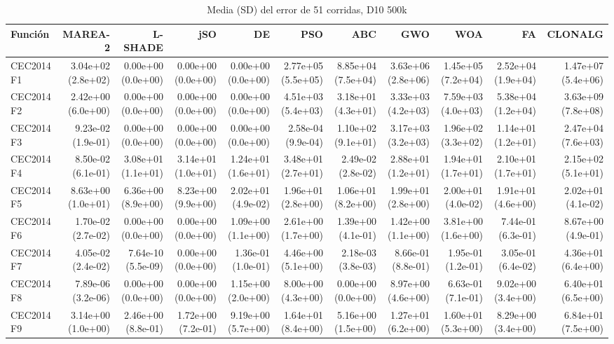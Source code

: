\begin{longtable}{lrrrrrrrrrr}
\caption{Media (SD) del error de 51 corridas, D10 500k}\\
\toprule
Función & MAREA-2 & L-SHADE & jSO & DE & PSO & ABC & GWO & WOA & FA & CLONALG \\
\midrule
\endhead
CEC2014 F1 & 3.04e+02 (2.8e+02) & 0.00e+00 (0.0e+00) & 0.00e+00 (0.0e+00) & 0.00e+00 (0.0e+00) & 2.77e+05 (5.5e+05) & 8.85e+04 (7.5e+04) & 3.63e+06 (2.8e+06) & 1.45e+05 (7.2e+04) & 2.52e+04 (1.9e+04) & 1.47e+07 (5.4e+06) \\
CEC2014 F2 & 2.42e+00 (6.0e+00) & 0.00e+00 (0.0e+00) & 0.00e+00 (0.0e+00) & 0.00e+00 (0.0e+00) & 4.51e+03 (5.4e+03) & 3.18e+01 (4.3e+01) & 3.33e+03 (4.2e+03) & 7.59e+03 (4.0e+03) & 5.38e+04 (1.2e+04) & 3.63e+09 (7.8e+08) \\
CEC2014 F3 & 9.23e-02 (1.9e-01) & 0.00e+00 (0.0e+00) & 0.00e+00 (0.0e+00) & 0.00e+00 (0.0e+00) & 2.58e-04 (9.9e-04) & 1.10e+02 (9.1e+01) & 3.17e+03 (3.2e+03) & 1.96e+02 (3.3e+02) & 1.14e+01 (1.2e+01) & 2.47e+04 (7.6e+03) \\
CEC2014 F4 & 8.50e-02 (6.1e-01) & 3.08e+01 (1.1e+01) & 3.14e+01 (1.0e+01) & 1.24e+01 (1.6e+01) & 3.48e+01 (2.7e+01) & 2.49e-02 (2.8e-02) & 2.88e+01 (1.2e+01) & 1.94e+01 (1.7e+01) & 2.10e+01 (1.7e+01) & 2.15e+02 (5.1e+01) \\
CEC2014 F5 & 8.63e+00 (1.0e+01) & 6.36e+00 (8.9e+00) & 8.23e+00 (9.9e+00) & 2.02e+01 (4.9e-02) & 1.96e+01 (2.8e+00) & 1.06e+01 (8.2e+00) & 1.99e+01 (2.8e+00) & 2.00e+01 (4.0e-02) & 1.91e+01 (4.6e+00) & 2.02e+01 (4.1e-02) \\
CEC2014 F6 & 1.70e-02 (2.7e-02) & 0.00e+00 (0.0e+00) & 0.00e+00 (0.0e+00) & 1.09e+00 (1.1e+00) & 2.61e+00 (1.7e+00) & 1.39e+00 (4.1e-01) & 1.42e+00 (1.1e+00) & 3.81e+00 (1.6e+00) & 7.44e-01 (6.3e-01) & 8.67e+00 (4.9e-01) \\
CEC2014 F7 & 4.05e-02 (2.4e-02) & 7.64e-10 (5.5e-09) & 0.00e+00 (0.0e+00) & 1.36e-01 (1.0e-01) & 4.46e+00 (5.1e+00) & 2.18e-03 (3.8e-03) & 8.66e-01 (8.8e-01) & 1.95e-01 (1.2e-01) & 3.05e-01 (6.4e-02) & 4.36e+01 (6.4e+00) \\
CEC2014 F8 & 7.89e-06 (3.2e-06) & 0.00e+00 (0.0e+00) & 0.00e+00 (0.0e+00) & 1.15e+00 (2.0e+00) & 8.00e+00 (4.3e+00) & 0.00e+00 (0.0e+00) & 8.97e+00 (4.6e+00) & 6.63e-01 (7.1e-01) & 9.02e+00 (3.4e+00) & 6.40e+01 (6.5e+00) \\
CEC2014 F9 & 3.14e+00 (1.0e+00) & 2.46e+00 (8.8e-01) & 1.72e+00 (7.2e-01) & 9.19e+00 (5.7e+00) & 1.64e+01 (8.4e+00) & 5.16e+00 (1.5e+00) & 1.27e+01 (6.2e+00) & 1.60e+01 (5.3e+00) & 8.29e+00 (3.4e+00) & 6.84e+01 (7.5e+00) \\

\end{longtable}
